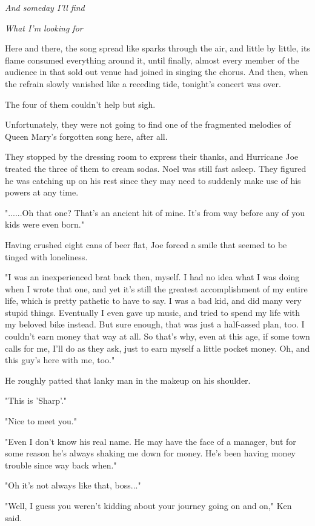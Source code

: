 \documentclass[
]{article}
\begin{document}
\emph{And someday I'll find}

\emph{What I'm looking for}

\emph{}Here and there, the song spread like sparks through the air, and
little by little, its flame consumed everything around it, until
finally, almost every member of the audience in that sold out venue had
joined in singing the chorus. And then, when the refrain slowly vanished
like a receding tide, tonight's concert was over.

The four of them couldn't help but sigh.

Unfortunately, they were not going to find one of the fragmented
melodies of Queen Mary's forgotten song here, after all.

They stopped by the dressing room to express their thanks, and Hurricane
Joe treated the three of them to cream sodas. Noel was still fast
asleep. They figured he was catching up on his rest since they may need
to suddenly make use of his powers at any time.

"......Oh that one? That's an ancient hit of mine. It's from way before
any of you kids were even born."

Having crushed eight cans of beer flat, Joe forced a smile that seemed
to be tinged with loneliness.

"I was an inexperienced brat back then, myself. I had no idea what I was
doing when I wrote that one, and yet it's still the greatest
accomplishment of my entire life, which is pretty pathetic to have to
say. I was a bad kid, and did many very stupid things. Eventually I even
gave up music, and tried to spend my life with my beloved bike instead.
But sure enough, that was just a half-assed plan, too. I couldn't earn
money that way at all. So that's why, even at this age, if some town
calls for me, I'll do as they ask, just to earn myself a little pocket
money. Oh, and this guy's here with me, too."

He roughly patted that lanky man in the makeup on his shoulder.

"This is 'Sharp'."

"Nice to meet you."

"Even I don't know his real name. He may have the face of a manager, but
for some reason he's always shaking me down for money. He's been having
money trouble since way back when."

"Oh it's not always like that, boss..."

"Well, I guess you weren't kidding about your journey going on and on,"
Ken said.
\end{document}
